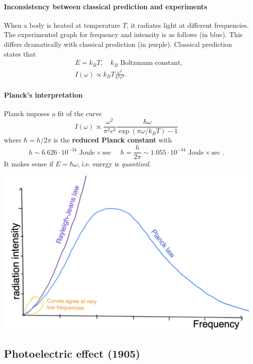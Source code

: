 \documentclass[a4paper,11pt]{article}
\begin{document}
\paragraph{Inconsistency between classical prediction and experiments}
When a body is heated at temperature $T$, it radiates light at different frequencies. The experimented graph for frequency and intensity is as follows (in blue). This differs dramatically with classical prediction (in purple). Classical prediction states that 
\begin{align*}
    &E = k_B T, \quad k_B \text{ Boltzmann constant},\\ 
    &I(\omega) \propto k_B T \frac{\omega^2}{\pi^2 c^3}. 
\end{align*}
\paragraph{Planck's interpretation}
Planck imposes a fit of the curve 
\[
    I(\omega) \propto \frac{\omega^2}{\pi^2c^3} \frac{\hbar \omega}{\exp(\pi \omega/k_B T)-1}
\]
where $ \hbar = h/2\pi $ is the \textbf{reduced Planck constant} with 
\[
    h \sim 6.626 \cdot 10^{-34} \text { Joule} \times \text {sec } \quad \hbar=\frac{h}{2 \pi} \sim 1.055 \cdot 10^{-34} \text { Joule} \times \text {sec }. 
\]
It makes sense if $ E = \hbar \omega $, i.e. energy is \textit{quantized}.
\begin{center}
    \includegraphics[scale=0.15]{qm1.png}
\end{center}

\subsection{Photoelectric effect (1905)}
\end{document}
